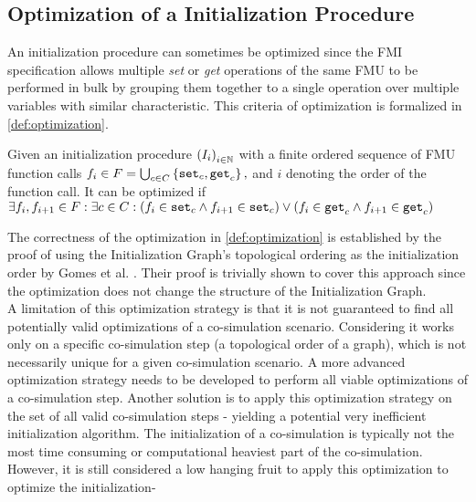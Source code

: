 \subsection{Optimization of a Initialization Procedure}
An initialization procedure can sometimes be optimized since the FMI specification allows multiple \textit{set} or \textit{get} operations of the same FMU to be performed in bulk by grouping them together to a single operation over multiple variables with similar characteristic. This criteria of optimization is formalized in \cref{def:optimization}.
\begin{definition}\label{def:optimization}
  Given an initialization procedure $ \left( I_i \right)_{i \in \mathbb{N}}$ with a finite ordered sequence of FMU function calls $f_i \in F = \bigcup_{c \in C}  \left\{ \mathtt{set}_{c},\mathtt{get}_{c} \right\},$ and $i$ denoting the order of the function call. It can be optimized if $\exists f_i, f_{i +1} \in F : \exists c \in C :(f_i \in {\mathtt{set}_{c}} \land f_{i+1} \in {\mathtt{set}_{c}}) \lor (f_i \in {\mathtt{get}_{c}} \land f_{i+1} \in {\mathtt{get}_{c}})$
\end{definition}
The correctness of the optimization in \cref{def:optimization} is established by the proof of using the Initialization Graph's topological ordering as the initialization order by Gomes et al. \cite{Gomes2019}. Their proof is trivially shown to cover this approach since the optimization does not change the structure of the Initialization Graph. \\
A limitation of this optimization strategy is that it is not guaranteed to find all potentially valid optimizations of a co-simulation scenario. Considering it works only on a specific co-simulation step (a topological order of a graph), which is not necessarily unique for a given co-simulation scenario. A more advanced optimization strategy needs to be developed to perform all viable optimizations of a co-simulation step. Another solution is to apply this optimization strategy on the set of all valid co-simulation steps - yielding a potential very inefficient initialization algorithm.
The initialization of a co-simulation is typically not the most time consuming or computational heaviest part of the co-simulation. However, it is still considered a low hanging fruit to apply this optimization to optimize the initialization-

